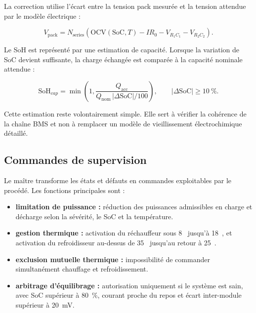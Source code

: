 \noindent
La correction utilise l'écart entre la tension pack mesurée et la tension attendue par le modèle électrique :

\begin{equation}
  V_\mathrm{pack}
  =
  N_\mathrm{series}
  \left(
  \mathrm{OCV}(\mathrm{SoC},T)
  - I R_0
  - V_{R_1C_1}
  - V_{R_2C_2}
  \right).
  \label{eq:ch4_mesure_ekf}
\end{equation}

\noindent
Le SoH est représenté par une estimation de capacité. Lorsque la variation de SoC devient suffisante, la charge échangée est comparée à la capacité nominale attendue :

\begin{equation}
  \mathrm{SoH}_{cap}
  =
  \min\left(1,\frac{Q_\mathrm{acc}}{Q_\mathrm{nom}\,|\Delta \mathrm{SoC}|/100}\right),
  \qquad |\Delta \mathrm{SoC}| \geq 10~\%.
  \label{eq:ch4_soh_cap}
\end{equation}

\noindent
Cette estimation reste volontairement simple. Elle sert à vérifier la cohérence de la chaîne BMS et non à remplacer un modèle de vieillissement électrochimique détaillé.

\subsection{Commandes de supervision}
\label{subsec:ch4_commandes_supervision}

Le maître transforme les états et défauts en commandes exploitables par le procédé. Les fonctions principales sont :
\begin{itemize}
  \item \textbf{limitation de puissance :} réduction des puissances admissibles en charge et décharge selon la sévérité, le SoC et la température.
  \item \textbf{gestion thermique :} activation du réchauffeur sous 8~\textcelsius{} jusqu'à 18~\textcelsius{}, et activation du refroidisseur au-dessus de 35~\textcelsius{} jusqu'au retour à 25~\textcelsius{}.
  \item \textbf{exclusion mutuelle thermique :} impossibilité de commander simultanément chauffage et refroidissement.
  \item \textbf{arbitrage d'équilibrage :} autorisation uniquement si le système est sain, avec SoC supérieur à 80~\%, courant proche du repos et écart inter-module supérieur à 20~mV.
\end{itemize}


